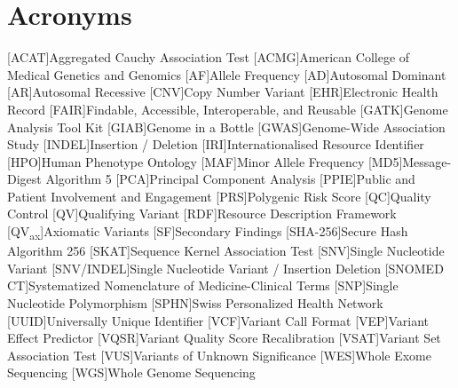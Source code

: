 \section*{Acronyms}
\renewenvironment{description}
{\list{}{\labelwidth0pt\itemindent-\leftmargin
    \parsep-1em\itemsep0pt\let\makelabel\descriptionlabel}}
               {\endlist}
\begin{acronym} 
 [ACAT]{Aggregated Cauchy Association Test }
 [ACMG]{American College of Medical Genetics and Genomics}
 [AF]{Allele Frequency}
 [AD]{Autosomal Dominant}
 [AR]{Autosomal Recessive}
  [CNV]{Copy Number Variant}
  [EHR]{Electronic Health Record}
 [FAIR]{Findable, Accessible, Interoperable, and Reusable}
 [GATK]{Genome Analysis Tool Kit}
  [GIAB]{Genome in a Bottle}
 [GWAS]{Genome-Wide Association Study}
 [INDEL]{Insertion / Deletion}
 [IRI]{Internationalised Resource Identifier}
 [HPO]{Human Phenotype Ontology}
 [MAF]{Minor Allele Frequency}
  [MD5]{Message-Digest Algorithm 5}
  [PCA]{Principal Component Analysis} 
 [PPIE]{Public and Patient Involvement and Engagement}
 [PRS]{Polygenic Risk Score} 
 [QC]{Quality Control}
 [QV]{Qualifying Variant}
 [RDF]{Resource Description Framework}
 [QV\textsubscript{ax}]{Axiomatic Variants}
 [SF]{Secondary Findings}
 [SHA-256]{Secure Hash Algorithm 256}
 [SKAT]{Sequence Kernel Association Test} 
 [SNV]{Single Nucleotide Variant}
  [SNV/INDEL]{Single Nucleotide Variant / Insertion Deletion}
  [SNOMED CT]{Systematized Nomenclature of Medicine-Clinical Terms}
 [SNP]{Single Nucleotide Polymorphism}
 [SPHN]{Swiss Personalized Health Network}
 [UUID]{Universally Unique Identifier}
 [VCF]{Variant Call Format}
  [VEP]{Variant Effect Predictor}
 [VQSR]{Variant Quality Score Recalibration}
 [VSAT]{Variant Set Association Test}
 [VUS]{Variants of Unknown Significance}
 [WES]{Whole Exome Sequencing}
 [WGS]{Whole Genome Sequencing}
\end{acronym}


 
\clearpage
\FloatBarrier

